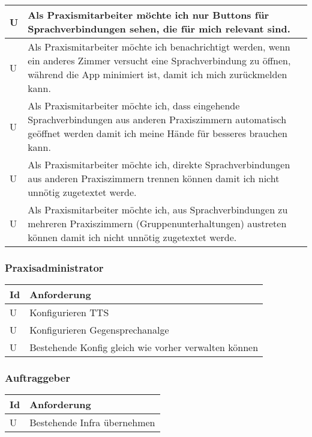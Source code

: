 \begin{table}[h]
\begin{tabular}{|l|p{15cm}|}
        \hline
        U           & Als Praxismitarbeiter möchte ich nur Buttons für Sprachverbindungen sehen, die für mich relevant sind.                                                                                     \\
        \hline
        U           & Als Praxismitarbeiter möchte ich benachrichtigt werden, wenn ein anderes Zimmer versucht eine Sprachverbindung zu öffnen, während die App minimiert ist, damit ich mich zurückmelden kann. \\
        \hline
        U           & Als Praxismitarbeiter möchte ich, dass eingehende Sprachverbindungen aus anderen Praxiszimmern automatisch geöffnet werden damit ich meine Hände für besseres brauchen kann.               \\
        \hline
        U           & Als Praxismitarbeiter möchte ich, direkte Sprachverbindungen aus anderen Praxiszimmern trennen können damit ich nicht unnötig zugetextet werde.                                            \\
        \hline
        U           & Als Praxismitarbeiter möchte ich, aus Sprachverbindungen zu mehreren Praxiszimmern (Gruppenunterhaltungen) austreten können damit ich nicht unnötig zugetextet werde.                      \\
        \hline
    \end{tabular}\label{tab:userstories1}
\end{table}


\subsubsection*{Praxisadministrator}

\begin{table}[h]
    \centering
    \begin{tabular}{|l|p{15cm}|}
        \hline
        \textbf{Id} & \textbf{Anforderung}            \\
        \hline
        U           & Konfigurieren TTS               \\
        \hline
        U           & Konfigurieren Gegensprechanalge \\
        \hline
        U           & Bestehende Konfig gleich wie vorher verwalten können \\
        \hline
    \end{tabular}\label{tab:userstories2}
\end{table}

\subsubsection*{Auftraggeber}

\begin{table}[h]
    \centering
    \begin{tabular}{|l|p{15cm}|}
        \hline
        \textbf{Id} & \textbf{Anforderung}        \\
        \hline
        U           & Bestehende Infra übernehmen \\
        \hline
    \end{tabular}\label{tab:userstories3}
\end{table}


\clearpage
